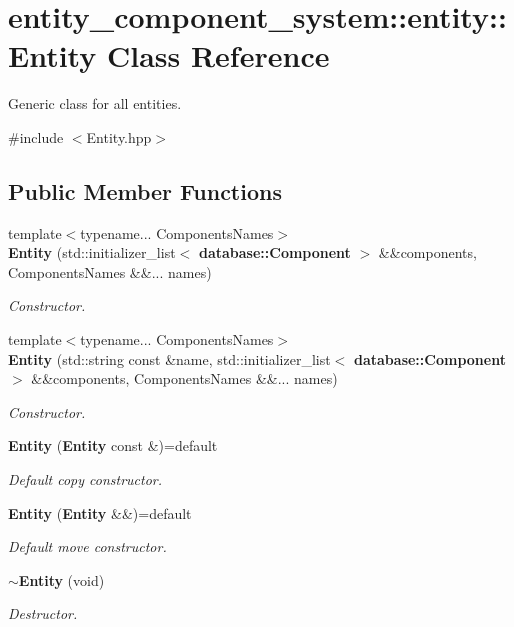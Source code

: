 \section{entity\+\_\+component\+\_\+system\+:\+:entity\+:\+:Entity Class Reference}
\label{classentity__component__system_1_1entity_1_1_entity}


Generic class for all entities.  




{\ttfamily \#include $<$Entity.\+hpp$>$}

\subsection*{Public Member Functions}
\begin{DoxyCompactItemize}
\item 
{\footnotesize template$<$typename... Components\+Names$>$ }\\{\bf Entity} (std\+::initializer\+\_\+list$<$ {\bf database\+::\+Component} $>$ \&\&components, Components\+Names \&\&... names)
\begin{DoxyCompactList}\small\item\em Constructor. \end{DoxyCompactList}\item 
{\footnotesize template$<$typename... Components\+Names$>$ }\\{\bf Entity} (std\+::string const \&name, std\+::initializer\+\_\+list$<$ {\bf database\+::\+Component} $>$ \&\&components, Components\+Names \&\&... names)
\begin{DoxyCompactList}\small\item\em Constructor. \end{DoxyCompactList}\item 
{\bf Entity} ({\bf Entity} const \&)=default
\begin{DoxyCompactList}\small\item\em Default copy constructor. \end{DoxyCompactList}\item 
{\bf Entity} ({\bf Entity} \&\&)=default
\begin{DoxyCompactList}\small\item\em Default move constructor. \end{DoxyCompactList}\item 
{\bf $\sim$\+Entity} (void)
\begin{DoxyCompactList}\small\item\em Destructor. \end{DoxyCompactList}\item 

\end{DoxyCompactItemize}
